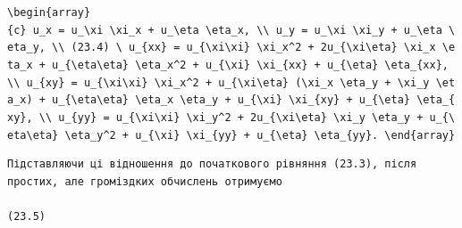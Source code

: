 \documentclass[
  ukrainian,
]{article}
\begin{document}
\texttt{\textbackslash{}begin\{array\}\{c\}\ u\_x\ =\ u\_\textbackslash{}xi\ \textbackslash{}xi\_x\ +\ u\_\textbackslash{}eta\ \textbackslash{}eta\_x,\ \textbackslash{}\textbackslash{}\ u\_y\ =\ u\_\textbackslash{}xi\ \textbackslash{}xi\_y\ +\ u\_\textbackslash{}eta\ \textbackslash{}eta\_y,\ \textbackslash{}\textbackslash{}\ (23.4)\ \textbackslash{}\ u\_\{xx\}\ =\ u\_\{\textbackslash{}xi\textbackslash{}xi\}\ \textbackslash{}xi\_x\^{}2\ +\ 2u\_\{\textbackslash{}xi\textbackslash{}eta\}\ \textbackslash{}xi\_x\ \textbackslash{}eta\_x\ +\ u\_\{\textbackslash{}eta\textbackslash{}eta\}\ \textbackslash{}eta\_x\^{}2\ +\ u\_\{\textbackslash{}xi\}\ \textbackslash{}xi\_\{xx\}\ +\ u\_\{\textbackslash{}eta\}\ \textbackslash{}eta\_\{xx\},\ \textbackslash{}\textbackslash{}\ u\_\{xy\}\ =\ u\_\{\textbackslash{}xi\textbackslash{}xi\}\ \textbackslash{}xi\_x\^{}2\ +\ u\_\{\textbackslash{}xi\textbackslash{}eta\}\ (\textbackslash{}xi\_x\ \textbackslash{}eta\_y\ +\ \textbackslash{}xi\_y\ \textbackslash{}eta\_x)\ +\ u\_\{\textbackslash{}eta\textbackslash{}eta\}\ \textbackslash{}eta\_x\ \textbackslash{}eta\_y\ +\ u\_\{\textbackslash{}xi\}\ \textbackslash{}xi\_\{xy\}\ +\ u\_\{\textbackslash{}eta\}\ \textbackslash{}eta\_\{xy\},\ \textbackslash{}\textbackslash{}\ u\_\{yy\}\ =\ u\_\{\textbackslash{}xi\textbackslash{}xi\}\ \textbackslash{}xi\_y\^{}2\ +\ 2u\_\{\textbackslash{}xi\textbackslash{}eta\}\ \textbackslash{}xi\_y\ \textbackslash{}eta\_y\ +\ u\_\{\textbackslash{}eta\textbackslash{}eta\}\ \textbackslash{}eta\_y\^{}2\ +\ u\_\{\textbackslash{}xi\}\ \textbackslash{}xi\_\{yy\}\ +\ u\_\{\textbackslash{}eta\}\ \textbackslash{}eta\_\{yy\}.\ \textbackslash{}end\{array\}}

\begin{verbatim}
Підставляючи ці відношення до початкового рівняння (23.3), після простих, але громіздких обчислень отримуємо

(23.5)
\end{verbatim}
\end{document}
